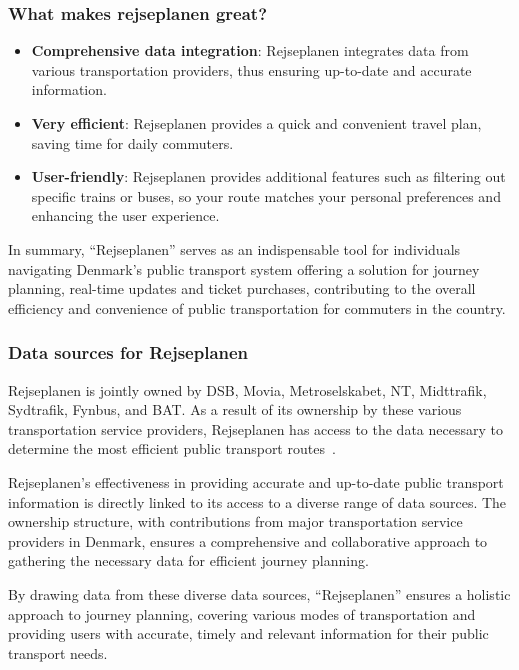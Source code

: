 \subsubsection{What makes rejseplanen great?}
\begin{itemize}
    \item \textbf{Comprehensive data integration}: Rejseplanen integrates data from various transportation providers,
    thus ensuring up-to-date and accurate information.
    \item \textbf{Very efficient}: Rejseplanen provides a quick and convenient travel plan, saving time for daily
    commuters.
    \item \textbf{User-friendly}: Rejseplanen provides additional features such as filtering out specific trains or
    buses, so your route matches your personal preferences and enhancing the user experience.
\end{itemize}

In summary, ``Rejseplanen'' serves as an indispensable tool for individuals navigating Denmark's public transport system
offering a solution for journey planning, real-time updates and ticket purchases, contributing to the overall efficiency
and convenience of public transportation for commuters in the country.

\subsubsection{Data sources for Rejseplanen}
Rejseplanen is jointly owned by DSB, Movia, Metroselskabet, NT, Midttrafik, Sydtrafik, Fynbus, and BAT\@.
As a result of its ownership by these various transportation service providers, Rejseplanen has access to the data
necessary to determine the most efficient public transport routes~\cite{rejseplanen2023}.

Rejseplanen's effectiveness in providing accurate and up-to-date public transport information is directly linked to its
access to a diverse range of data sources.
The ownership structure, with contributions from major transportation service providers in Denmark, ensures a
comprehensive and collaborative approach to gathering the necessary data for efficient journey planning.

By drawing data from these diverse data sources, ``Rejseplanen'' ensures a holistic approach to journey planning,
covering various modes of transportation and providing users with accurate, timely and relevant information for their
public transport needs.

